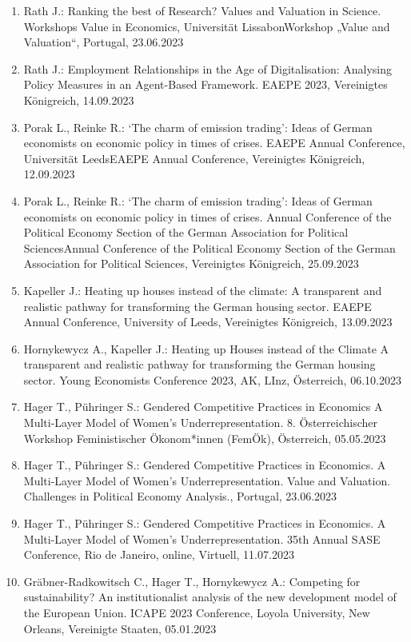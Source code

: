 \begin{enumerate}
	\item Rath J.: Ranking the best of Research? Values and Valuation in Science. Workshops Value in Economics, Universität LissabonWorkshop „Value and Valuation“, Portugal, 23.06.2023
	\item Rath J.: Employment Relationships in the Age of Digitalisation: Analysing Policy Measures in an Agent-Based Framework. EAEPE 2023, Vereinigtes Königreich, 14.09.2023
	\item Porak L., Reinke R.: ‘The charm of emission trading’: Ideas of German economists on economic policy in times of crises. EAEPE Annual Conference, Universität LeedsEAEPE Annual Conference, Vereinigtes Königreich, 12.09.2023
	\item Porak L., Reinke R.: ‘The charm of emission trading’: Ideas of German economists on economic policy in times of crises. Annual Conference of the Political Economy Section of the German Association for Political SciencesAnnual Conference of the Political Economy Section of the German Association for Political Sciences, Vereinigtes Königreich, 25.09.2023
	\item Kapeller J.: Heating up houses instead of the climate: A transparent and realistic pathway for transforming the German housing sector. EAEPE Annual Conference, University of Leeds, Vereinigtes Königreich, 13.09.2023
	\item Hornykewycz A., Kapeller J.: Heating up Houses instead of the Climate A transparent and realistic pathway for transforming the German housing sector. Young Economists Conference 2023, AK, LInz, Österreich, 06.10.2023
	\item Hager T., Pühringer S.: Gendered Competitive Practices in Economics A Multi-Layer Model of Women’s Underrepresentation. 8. Österreichischer Workshop Feministischer Ökonom*innen (FemÖk), Österreich, 05.05.2023
	\item Hager T., Pühringer S.: Gendered Competitive Practices in Economics. A Multi-Layer Model of Women’s Underrepresentation. Value and Valuation. Challenges in Political Economy Analysis., Portugal, 23.06.2023
	\item Hager T., Pühringer S.: Gendered Competitive Practices in Economics. A Multi-Layer Model of Women’s Underrepresentation. 35th Annual SASE Conference, Rio de Janeiro, online, Virtuell, 11.07.2023
	\item Gräbner-Radkowitsch C., Hager T., Hornykewycz A.: Competing for sustainability? An institutionalist analysis of the new development model of the European Union. ICAPE 2023 Conference, Loyola University, New Orleans, Vereinigte Staaten, 05.01.2023

\end{enumerate}
